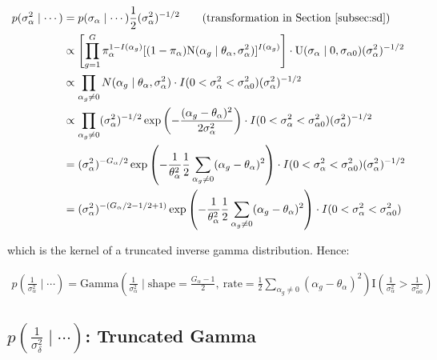 \documentclass{article}\usepackage{graphicx, color}
\begin{document}
\begin{flushleft}
\begin{align*}
p(\sigma_\alpha^2 \mid \cdots ) & = p(\sigma_\alpha \mid \cdots) \frac{1}{2} (\sigma_\alpha^2)^{-1/2} \qquad \text{(transformation in Section \ref{subsec:sd})} \\
&\propto \left [ \prod_{g = 1}^G  \pi_\alpha^{1-I(\alpha_g)}[(1- \pi_\alpha)\text{N}(\alpha_g \mid \theta_\alpha, \sigma_\alpha^2)]^{I(\alpha_g)} \right ]  \cdot \text{U}(\sigma_\alpha \mid 0, \sigma_{\alpha 0})  (\sigma_\alpha^2)^{-1/2} \\
&\propto \prod_{\alpha_g \ne 0} N(\alpha_g \mid \theta_\alpha, \sigma_\alpha^2) \cdot I(0 < \sigma_\alpha^2 < \sigma_{\alpha 0}^2 )  (\sigma_\alpha^2)^{-1/2} \\
&\propto \prod_{\alpha_g \ne 0} (\sigma_\alpha^2)^{-1/2} \exp \left ( -\frac{(\alpha_g - \theta_\alpha)^2}{2 \sigma_\alpha^2}\right ) \cdot I(0 < \sigma_\alpha^2 < \sigma_{\alpha 0}^2 )  (\sigma_\alpha^2)^{-1/2} \\
&= (\sigma_\alpha^2)^{-G_\alpha/2} \exp \left ( -\frac{1}{\theta_\alpha^2} \frac{1}{2} \sum_{\alpha_g \ne 0} (\alpha_g - \theta_\alpha)^2 \right ) \cdot I(0 < \sigma_\alpha^2 < \sigma_{\alpha 0}^2 )  (\sigma_\alpha^2)^{-1/2} \\
&= (\sigma_\alpha^2)^{-(G_\alpha/2 -1 /2 + 1)} \exp \left ( -\frac{1}{\theta_\alpha^2} \frac{1}{2} \sum_{\alpha_g \ne 0} (\alpha_g - \theta_\alpha)^2 \right ) \cdot I(0 < \sigma_\alpha^2 < \sigma_{\alpha 0}^2 ) \\
\end{align*}

which is the kernel of a truncated inverse gamma distribution. Hence:

\begin{align*}
p \left ( \frac{1}{\sigma_\alpha^2} \mid \cdots \right ) = \text{Gamma} \left (\frac{1}{\sigma_\alpha^2} \mid \text{shape} = \frac{G_\alpha - 1}{2}, \ \text{rate} = \frac{1}{2} \sum_{\alpha_g \ne 0} (\alpha_g - \theta_\alpha)^2 \right ) \text{I} \left (\frac{1}{\sigma_\alpha^2} >\frac{1}{ \sigma_{\alpha 0}^2} \right )
\end{align*}

\subsection{$p \left (\frac{1}{\sigma_\delta^2} \mid \cdots  \right )$: Truncated Gamma}


\end{flushleft}
\end{document}
